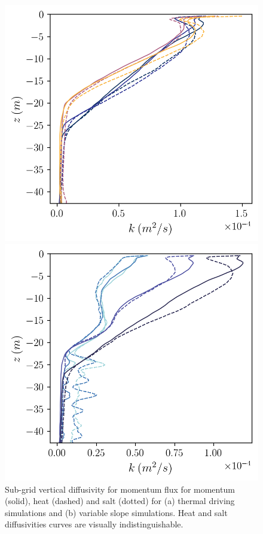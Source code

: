\documentclass[draft,jgrga]{agutexSI2019}
\begin{document}
\begin{figure}[]
    \centering
    \begin{minipage}{0.5\textwidth}
        \includegraphics[trim={0 0 0 0},clip, width=\textwidth]{Figures/k_cmp_dT_43h_tav13h_z_profile.png}
    \end{minipage}%
    \begin{minipage}{0.5\textwidth}
        \includegraphics[trim={0 0 0 0},clip, width=\textwidth]{Figures/k_cmp_dslope_43h_tav13h_z_profile.png}
    \end{minipage}
    \caption{Sub-grid vertical diffusivity for momentum flux for momentum (solid), heat (dashed) and salt (dotted) for (a) thermal driving simulations and (b) variable slope simulations. Heat and salt diffusivities curves are visually indistinguishable.}
    \label{fig:k_all}
\end{figure}
\end{document}
